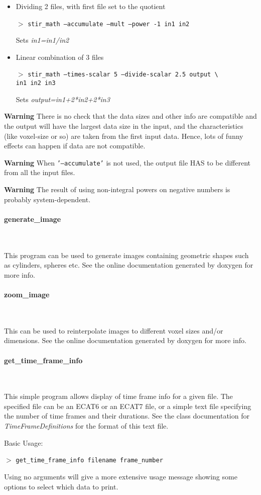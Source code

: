\documentclass{article}
\newcommand{\subsubsubsection}[1]{\paragraph{#1}\mbox{} \\}
\newcommand{\cmdline}[1]{\par \noindent $>$ \texttt{#1}\par}
\begin{document}
{{{\begin{itemize}
Sets \textit{output=in1/max(in2,.1)}\\
\item
Dividing 2 files, with first file set to the quotient
\cmdline{stir\_math --accumulate --mult --power -1 in1 in2}


Sets \textit{in1=in1/in2}\\
\item
Linear combination of 3 files
\cmdline{stir\_math --times-scalar 5 --divide-scalar 2.5 output {\textbackslash}\\
in1 in2 in3}


Sets \textit{output=in1+2*in2+2*in3}
\end{itemize}

\textbf{Warning} There is no check that the data sizes and other info 
are compatible and the output will have the largest data size 
in the input, and the characteristics (like voxel-size or so) 
are taken from the first input data. Hence, lots of funny effects 
can happen if data are not compatible.


\textbf{Warning} When \texttt{'--accumulate'} is not used, the output file 
HAS to be different from all the input files.

\textbf{Warning} The result of using non-integral powers on negative 
numbers is probably system-dependent.

{ \subsubsubsection{generate\_image}
}

This program can be used to generate 
images containing geometric shapes such as cylinders, spheres 
etc. See the online documentation generated by doxygen for more 
info.

{ \subsubsubsection{zoom\_image}
}

This can be used to reinterpolate 
images to different voxel sizes and/or dimensions. See the online 
documentation generated by doxygen for more info.

{ \subsubsubsection{get\_time\_frame\_info}
}
\label{sec:get_time_frame_info}
This simple program allows display of time frame info for a given 
file. The specified file can be an ECAT6 or an ECAT7 file, or 
a simple text file specifying the number of time frames and their 
durations. See the class documentation for \textit{TimeFrameDefinitions} 
for the format of this text file.


\noindent
Basic Usage:
\cmdline{get\_time\_frame\_info filename frame\_number}


Using no arguments will give a more extensive usage message showing 
some options to select which data to print.

}}}
\end{document}
